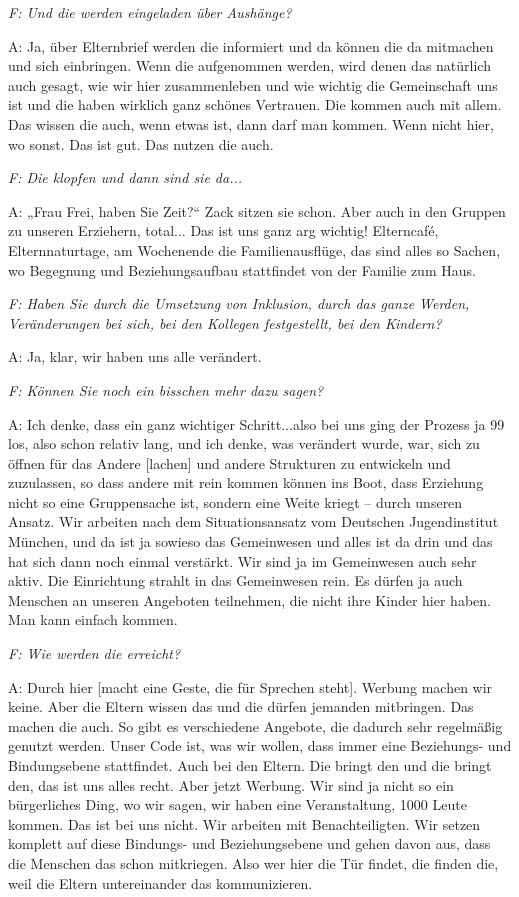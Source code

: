 \begin{linenumbers}
\emph{F: Und die werden eingeladen über Aushänge?}

A: Ja, über Elternbrief werden die informiert und da können die da mitmachen und sich einbringen.
Wenn die aufgenommen werden, wird denen das natürlich auch gesagt, wie wir hier zusammenleben und wie wichtig die Gemeinschaft uns ist und die haben wirklich ganz schönes Vertrauen. Die kommen auch mit allem. Das wissen die auch, wenn etwas ist, dann darf man kommen. Wenn nicht hier, wo sonst. Das ist gut. Das nutzen die auch. 

\emph{F: Die klopfen und dann sind sie da...}

A: „Frau Frei, haben Sie Zeit?“ Zack sitzen sie schon. Aber auch in den Gruppen zu unseren Erziehern, total... Das ist uns ganz arg wichtig!
Elterncafé, Elternnaturtage, am Wochenende die Familienausflüge, das sind alles so Sachen, wo Begegnung und Beziehungsaufbau stattfindet von der Familie zum Haus.  
 
\emph{F: Haben Sie durch die Umsetzung von Inklusion, durch das ganze Werden, Veränderungen bei sich, bei den Kollegen festgestellt, bei den Kindern?}

A: Ja, klar, wir haben uns alle verändert. 

\emph{F: Können Sie noch ein bisschen mehr dazu sagen?}

A: Ich denke, dass ein ganz wichtiger Schritt...also bei uns ging der Prozess ja 99 los, also schon relativ lang, und ich denke, was verändert wurde, war, sich zu öffnen für das Andere [lachen] und andere Strukturen zu entwickeln und zuzulassen, so dass andere mit rein kommen können ins Boot, dass Erziehung nicht so eine Gruppensache ist, sondern eine Weite kriegt -- durch unseren Ansatz. Wir arbeiten nach dem Situationsansatz vom Deutschen Jugendinstitut München, und da ist ja sowieso das Gemeinwesen und alles ist da drin und das hat sich dann noch einmal verstärkt. Wir sind ja im Gemeinwesen auch sehr aktiv. Die Einrichtung strahlt in das Gemeinwesen rein. Es dürfen ja auch Menschen an unseren Angeboten teilnehmen, die nicht ihre Kinder hier haben. Man kann einfach kommen.

\emph{F: Wie werden die erreicht?}

A: Durch hier [macht eine Geste, die für Sprechen steht]. Werbung machen wir keine. Aber die Eltern wissen das und die dürfen jemanden mitbringen. Das machen die auch. So gibt es verschiedene Angebote, die dadurch sehr regelmäßig genutzt werden. Unser Code ist, was wir wollen, dass immer eine Beziehungs- und Bindungsebene stattfindet. Auch bei den Eltern. Die bringt den und die bringt den, das ist uns alles recht. Aber jetzt Werbung. Wir sind ja nicht so ein bürgerliches Ding, wo wir sagen, wir haben eine Veranstaltung, 1000 Leute kommen. Das ist bei uns nicht. Wir arbeiten mit Benachteiligten. Wir setzen komplett auf diese Bindungs- und Beziehungsebene und gehen davon aus, dass die Menschen das schon mitkriegen. Also wer hier die Tür findet, die finden die, weil die Eltern untereinander das kommunizieren. 


\end{linenumbers}
